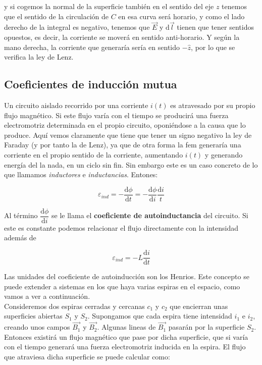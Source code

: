 \documentclass[12pt]{article}
\newcommand{\D}{\mathrm{d}}
\begin{document}
y si cogemos la normal de la superficie también en el sentido del eje $z$ tenemos que el sentido de la circulación de $C$ en esa curva será horario, y como el lado derecho de la integral es negativo, tenemos que $\vec{E}$ y $\D \vec{ l}$ tienen que tener sentidos opuestos, es decir, la corriente se moverá en sentido anti-horario. Y según la mano derecha, la corriente que generaría sería en sentido $- \widehat{z}$, por lo que se verifica la ley de Lenz. 

\subsection{Coeficientes de inducción mutua} \label{Subsec:4.4}

Un circuito aislado recorrido por una corriente $i(t)$ es atravesado por su propio flujo magnético. Si este flujo varía con el tiempo se producirá una fuerza electromotriz determinada en el propio circuito, oponiéndose a la causa que lo produce. Aquí vemos claramente que tiene que tener un signo negativo la ley de Faraday (y por tanto la de Lenz), ya que de otra forma la fem generaría una corriente en el propio sentido de la corriente, aumentando $i(t)$ y generando energía del la nada, en un ciclo sin fin. Sin embargo este es un caso concreto de lo que llamamos \textit{inductores} e \textit{inductancias}. Entones:

\begin{equation}
\varepsilon_{ind} = - \dfrac{\D \phi}{\D t} = - \dfrac{ \D \phi}{\D i} \dfrac{\D i}{t}
\end{equation}

Al término $\dfrac{\D \phi}{\D i}$ se le llama el \textbf{coeficiente de autoinductancia} del circuito. Si este es constante podemos relacionar el flujo directamente con la intensidad además de

\begin{equation}
\varepsilon_{ind} = - L \dfrac{\D i}{\D t}
\end{equation}

Las unidades del coeficiente de autoinducción son los Henrios. Este concepto se puede extender a sistemas en los que haya varias espiras en el espacio, como vamos a ver a continuación. \\

Consideremos dos espiras cerradas y cercanas $c_1$ y $c_2$ que encierran unas superficies abiertas $S_1$ y $S_2$. Supongamos que cada espira tiene intensidad $i_1$ e $i_2$, creando unos campos $\vec{B_1}$ y $\vec{B_2}$. Algunas lineas de $\vec{B_1}$ pasarán por la superficie $S_2$. Entonces existirá un flujo magnético que pase por dicha superficie, que si varía con el tiempo generará una fuerza electromotriz inducida en la espira. El flujo que atraviesa dicha superficie se puede calcular como:
\end{document}
